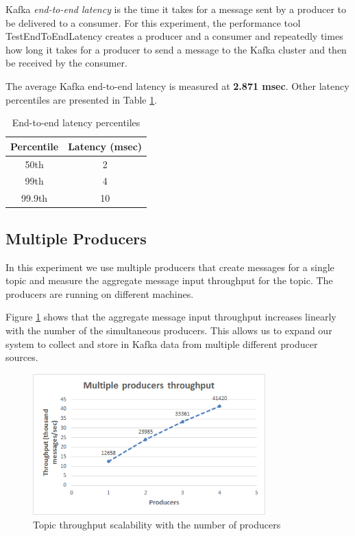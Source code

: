 Kafka \emph{end-to-end latency} is the time it takes for a message sent by a producer to be delivered to a consumer. For this experiment, the performance tool TestEndToEndLatency creates a producer and a consumer and repeatedly times how long it takes for a producer to send a message to the Kafka cluster and then be received by the consumer. 

The average Kafka end-to-end latency is measured at \textbf{2.871 msec}. Other latency percentiles are presented in Table \ref{table:end-to-end_latency}.

\begin{table}[h!]
\centering
\begin{tabular}{ |c|c| }
\hline
Percentile & Latency (msec) \\ \hline \hline
50th & 2 \\ \hline
99th & 4 \\ \hline
99.9th & 10 \\ \hline
\end{tabular}
\caption{End-to-end latency percentiles}
\label{table:end-to-end_latency}
\end{table}

\subsection{Multiple Producers}

In this experiment we use multiple producers that create messages for a single topic and measure the aggregate message input throughput for the topic. The producers are running on different machines.

Figure \ref{figure:benchmarks_kafka_producers} shows that the aggregate message input throughput increases linearly with the number of the simultaneous producers. This allows us to expand our system to collect and store in Kafka data from multiple different producer sources.

\begin{figure}[h!]
\centering
\includegraphics[width=0.8\textwidth]{figures/benchmarks_kafka_producers}
\caption{Topic throughput scalability with the number of producers}
\label{figure:benchmarks_kafka_producers}
\end{figure}

